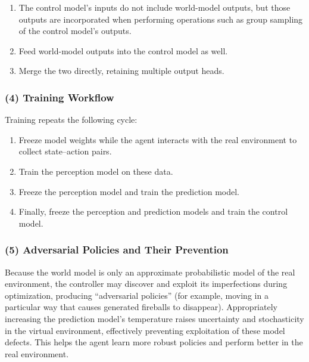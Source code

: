 \begin{enumerate}
\def\labelenumi{\arabic{enumi}.}
\item
  The control model's inputs do not include world-model outputs, but those outputs are incorporated when performing operations such as group sampling of the control model's outputs.
\item
  Feed world-model outputs into the control model as well.
\item
  Merge the two directly, retaining multiple output heads.
\end{enumerate}

\hypertarget{training-workflow}{%
\subsubsection{(4) Training Workflow}\label{training-workflow}}

Training repeats the following cycle:

\begin{enumerate}
\def\labelenumi{\arabic{enumi}.}
\item
  Freeze model weights while the agent interacts with the real environment to collect state--action pairs.
\item
  Train the perception model on these data.
\item
  Freeze the perception model and train the prediction model.
\item
  Finally, freeze the perception and prediction models and train the control model.
\end{enumerate}

\hypertarget{adversarial-policies-and-their-prevention}{%
\subsubsection{(5) Adversarial Policies and Their Prevention}\label{adversarial-policies-and-their-prevention}}

Because the world model is only an approximate probabilistic model of the real environment, the controller may discover and exploit its imperfections during optimization, producing ``adversarial policies'' (for example, moving in a particular way that causes generated fireballs to disappear). Appropriately increasing the prediction model's temperature raises uncertainty and stochasticity in the virtual environment, effectively preventing exploitation of these model defects. This helps the agent learn more robust policies and perform better in the real environment.

